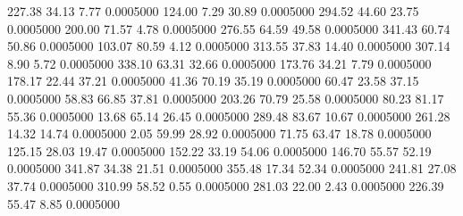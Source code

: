  227.38   34.13    7.77   0.0005000
 124.00    7.29   30.89   0.0005000
 294.52   44.60   23.75   0.0005000
 200.00   71.57    4.78   0.0005000
 276.55   64.59   49.58   0.0005000
 341.43   60.74   50.86   0.0005000
 103.07   80.59    4.12   0.0005000
 313.55   37.83   14.40   0.0005000
 307.14    8.90    5.72   0.0005000
 338.10   63.31   32.66   0.0005000
 173.76   34.21    7.79   0.0005000
 178.17   22.44   37.21   0.0005000
  41.36   70.19   35.19   0.0005000
  60.47   23.58   37.15   0.0005000
  58.83   66.85   37.81   0.0005000
 203.26   70.79   25.58   0.0005000
  80.23   81.17   55.36   0.0005000
  13.68   65.14   26.45   0.0005000
 289.48   83.67   10.67   0.0005000
 261.28   14.32   14.74   0.0005000
   2.05   59.99   28.92   0.0005000
  71.75   63.47   18.78   0.0005000
 125.15   28.03   19.47   0.0005000
 152.22   33.19   54.06   0.0005000
 146.70   55.57   52.19   0.0005000
 341.87   34.38   21.51   0.0005000
 355.48   17.34   52.34   0.0005000
 241.81   27.08   37.74   0.0005000
 310.99   58.52    0.55   0.0005000
 281.03   22.00    2.43   0.0005000
 226.39   55.47    8.85   0.0005000
